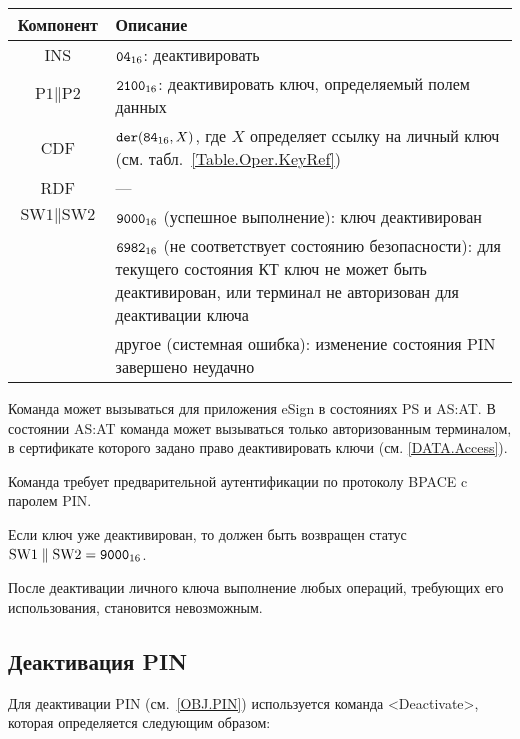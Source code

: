\noindent
\begin{tabular}{|c|p{14cm}|}
\hline
Компонент & Описание\\
\hline
\hline
INS & $\texttt{04}_{16}$: деактивировать\\
\hline
$\text{P1} \parallel \text{P2}$ & $\texttt{2100}_{16}$: 
деактивировать ключ, определяемый полем данных\\
\hline
CDF &  $\texttt{der}(\texttt{84}_{16}, X)$,   
где $X$ определяет ссылку на личный ключ 
(см. табл.~\ref{Table.Oper.KeyRef})\\
\hline \hline
RDF &  --- \\
\hline
$\text{SW1} \parallel \text{SW2}$ & 
$\texttt{9000}_{16}$ (успешное выполнение): ключ деактивирован\\
 & $\texttt{6982}_{16}$ (не соответствует состоянию безопасности): 
для текущего состояния КТ ключ не может быть деактивирован, 
или терминал не авторизован для деактивации ключа\\
 & другое (системная ошибка): изменение состояния PIN завершено 
неудачно\\
\hline
\end{tabular}

Команда может вызываться для приложения eSign в состояниях 
PS и AS:AT. В состоянии AS:AT команда может вызываться 
только авторизованным терминалом, в сертификате которого задано право
деактивировать ключи (см. \ref{DATA.Access}).

Команда требует предварительной аутентификации по 
протоколу BPACE c паролем PIN. 

Если ключ уже деактивирован, то должен быть возвращен статус
$\text{SW1} \parallel \text{SW2} = \texttt{9000}_{16}$.

После деактивации личного ключа выполнение любых операций, 
требующих его использования, становится невозможным.

\subsection{Деактивация PIN}
\label{Oper.Descr.DeactivatePIN} 

Для деактивации PIN (см.~\ref{OBJ.PIN}) 
используется команда <Deactivate>, 
которая определяется следующим образом:

